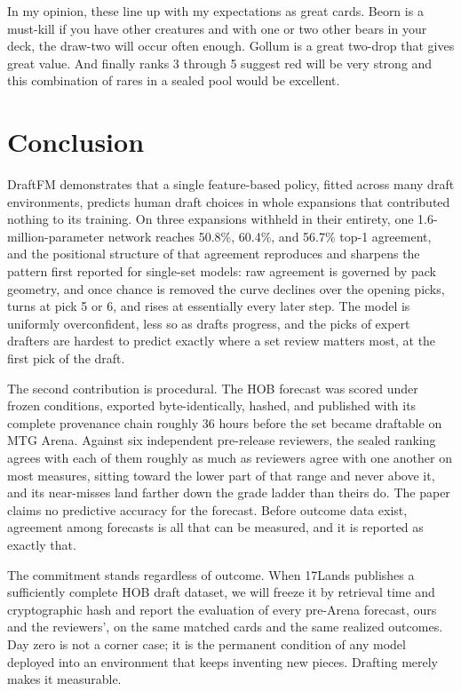 \documentclass[11pt]{article}
\numberwithin{equation}{section}
\begin{document}
In my opinion, these line up with my expectations as great cards. Beorn is a
must-kill if you have other creatures and with one or two other bears in your
deck, the draw-two will occur often enough. Gollum is a great two-drop that
gives great value. And finally ranks 3 through 5 suggest red will be very
strong and this combination of rares in a sealed pool would be excellent.

\section{Conclusion}
\label{sec:conclusion}

DraftFM demonstrates that a single feature-based policy, fitted across many
draft environments, predicts human draft choices in whole expansions that
contributed nothing to its training. On three expansions withheld in their
entirety, one 1.6-million-parameter network reaches 50.8\%, 60.4\%, and
56.7\% top-1 agreement, and the positional structure of that agreement
reproduces and sharpens the pattern first reported for single-set models:
raw agreement is governed by pack geometry, and once chance is removed the
curve declines over the opening picks, turns at pick 5 or 6, and rises at
essentially every later step. The model is uniformly overconfident, less so
as drafts progress, and the picks of expert drafters are hardest to predict
exactly where a set review matters most, at the first pick of the draft.

The second contribution is procedural. The HOB forecast was scored under
frozen conditions, exported byte-identically, hashed, and published with its
complete provenance chain roughly 36 hours before the set became draftable
on MTG Arena. Against six independent pre-release reviewers, the sealed
ranking agrees with each of them roughly as much as reviewers agree with one
another on most measures, sitting toward the lower part of that range and
never above it, and its near-misses land farther down the grade ladder than
theirs do. The paper claims no predictive accuracy for the forecast. Before
outcome data exist, agreement among forecasts is all that can be measured,
and it is reported as exactly that.

The commitment stands regardless of outcome. When 17Lands publishes a
sufficiently complete HOB draft dataset, we will freeze it by retrieval time
and cryptographic hash and report the evaluation of every pre-Arena
forecast, ours and the reviewers', on the same matched cards and the same
realized outcomes. Day zero is not a corner case; it is the permanent
condition of any model deployed into an environment that keeps inventing
new pieces. Drafting merely makes it measurable.
\end{document}
